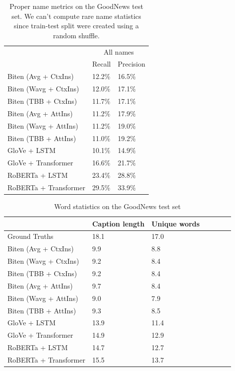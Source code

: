 \documentclass[10pt,twocolumn,letterpaper]{article}
\begin{document}
\begin{table}[t]
   \caption {Proper name metrics on the GoodNews test set. We can't compute rare name statistics
   since train-test split were created using a random shuffle.}
	\label{tab:results-names}
	\centering
	\begin{tabular}{lll}
		\toprule
        & \multicolumn{2}{c}{All names}  \\
        & Recall  & Precision \\
      \midrule
      Biten (Avg + CtxIns) \cite{Biten2019GoodNews} & 12.2\% & 16.5\% \\
      Biten (Wavg + CtxIns) \cite{Biten2019GoodNews} & 12.0\% & 17.1\% \\
      Biten (TBB + CtxIns) \cite{Biten2019GoodNews} & 11.7\% & 17.1\% \\
      Biten (Avg + AttIns) \cite{Biten2019GoodNews} & 11.2\% & 17.9\% \\
      Biten (Wavg + AttIns) \cite{Biten2019GoodNews} & 11.2\% & 19.0\% \\
      Biten (TBB + AttIns) \cite{Biten2019GoodNews} & 11.0\% & 19.2\% \\
      \midrule
      GloVe + LSTM & 10.1\% & 14.9\%  \\
      GloVe + Transformer & 16.6\% & 21.7\% \\
      RoBERTa + LSTM & 23.4\% & 28.8\%  \\
      RoBERTa + Transformer & 29.5\% & 33.9\%  \\
		\bottomrule
	\end{tabular}
\end{table}

\begin{table}[t]
	\caption {Word statistics on the GoodNews test set}
	\label{tab:results-stats}
	\centering
	\begin{tabular}{lllllll}
		\toprule
        & Caption length  & Unique words \\
      \midrule
      Ground Truths & 18.1 & 17.0 \\
      \midrule
      Biten (Avg + CtxIns) \cite{Biten2019GoodNews}  & 9.9 & 8.8 \\
      Biten (Wavg + CtxIns) \cite{Biten2019GoodNews}  & 9.2 & 8.4 \\
      Biten (TBB + CtxIns) \cite{Biten2019GoodNews}  & 9.2 & 8.4 \\
      Biten (Avg + AttIns) \cite{Biten2019GoodNews}  & 9.7 & 8.4 \\
      Biten (Wavg + AttIns) \cite{Biten2019GoodNews}  & 9.0 & 7.9 \\
      Biten (TBB + AttIns) \cite{Biten2019GoodNews}  & 9.3 & 8.5 \\
      \midrule
      GloVe + LSTM & 13.9 & 11.4 \\
      GloVe + Transformer & 14.9 & 12.9 \\
      RoBERTa + LSTM & 14.7 & 12.7  \\
      RoBERTa + Transformer & 15.5 & 13.7 \\
		\bottomrule
	\end{tabular}
\end{table}
\end{document}
